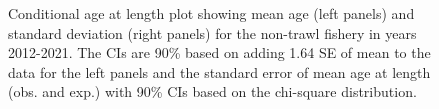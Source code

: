 \documentclass[
]{scrartcl}
\begin{document}
\begin{figure}[H]


\caption{\label{fig-call-plot-nt2}Conditional age at length plot showing
mean age (left panels) and standard deviation (right panels) for the
non-trawl fishery in years 2012-2021. The CIs are 90\% based on adding
1.64 SE of mean to the data for the left panels and the standard error
of mean age at length (obs. and exp.) with 90\% CIs based on the
chi-square distribution.}

\end{figure}%
\end{document}
